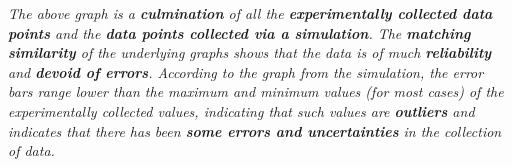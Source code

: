 \textit{The above graph is a \textbf{culmination} of all the \textbf{experimentally collected data points} and the \textbf{data points collected via a simulation}. The \textbf{matching similarity} of the underlying graphs shows that the data is of much \textbf{reliability} and \textbf{devoid of errors}. According to the graph from the simulation, the error bars range lower than the maximum and minimum values (for most cases) of the experimentally collected values, indicating that such values are \textbf{outliers} and indicates that there has been \textbf{some errors and uncertainties} in the collection of data.}
